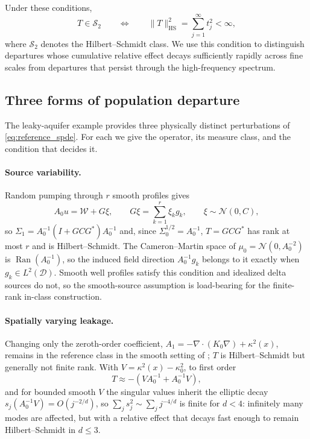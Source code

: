 \documentclass[11pt]{article}
\numberwithin{table}{section}
\numberwithin{figure}{section}
\begin{document}
Under these conditions,
\begin{equation}
    T\in\mathcal S_2
    \qquad\Longleftrightarrow\qquad
    \|T\|_{\mathrm{HS}}^2
    =
    \sum_{j=1}^{\infty}t_j^2
    <\infty ,
    \label{eq:HScriterion}
\end{equation}
where $\mathcal S_2$ denotes the Hilbert--Schmidt class. We use this condition to distinguish departures whose cumulative relative effect decays sufficiently rapidly across fine scales from departures that persist through the high-frequency spectrum.

\subsection{Three forms of population departure}
\label{sec:three_departures}

The leaky-aquifer example provides three physically distinct perturbations of \eqref{eq:reference_spde}. For each we give the operator, its measure class, and the condition that decides it.

\paragraph{Source variability.} Random pumping through $r$ smooth profiles gives
\begin{equation}
    A_0u=\mathcal W+G\xi,
    \qquad
    G\xi=\sum_{k=1}^{r}\xi_kg_k,
    \qquad
    \xi\sim\mathcal N(0,C),
    \label{eq:source_departure}
\end{equation}
so $\Sigma_1=A_0^{-1}(I+GCG^\ast)A_0^{-1}$ and, since $\Sigma_0^{1/2}=A_0^{-1}$, $T=GCG^\ast$ has rank at most $r$ and is Hilbert--Schmidt. The Cameron--Martin space of $\mu_0=\mathcal N(0,A_0^{-2})$ is $\operatorname{Ran}(A_0^{-1})$, so the induced field direction $A_0^{-1}g_k$ belongs to it exactly when $g_k\in L^2(\mathcal D)$. Smooth well profiles satisfy this condition and idealized delta sources do not, so the smooth-source assumption is load-bearing for the finite-rank in-class construction.

\paragraph{Spatially varying leakage.} Changing only the zeroth-order coefficient, $A_1=-\nabla\!\cdot(K_0\nabla)+\kappa^2(x)$, remains in the reference class in the smooth setting of \citet[Thm.~4.11 and Table~1]{BolinKirchner2023}; $T$ is Hilbert--Schmidt but generally not finite rank. With $V=\kappa^2(x)-\kappa_0^2$, to first order
\begin{equation}
    T\approx-\left(VA_0^{-1}+A_0^{-1}V\right),
    \label{eq:leakage_first_order}
\end{equation}
and for bounded smooth $V$ the singular values inherit the elliptic decay $s_j(A_0^{-1}V)=O(j^{-2/d})$, so $\sum_js_j^2\sim\sum_jj^{-4/d}$ is finite for $d<4$: infinitely many modes are affected, but with a relative effect that decays fast enough to remain Hilbert--Schmidt in $d\le3$.
\end{document}
